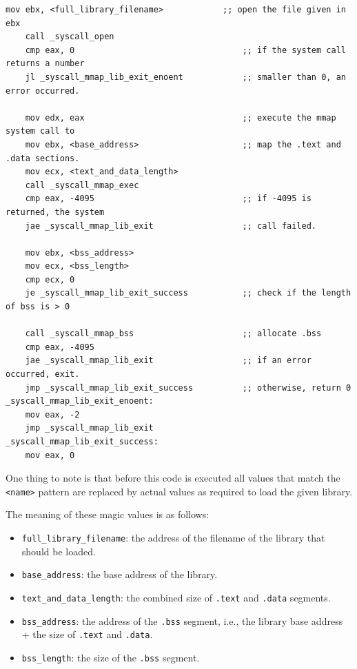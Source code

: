 \documentclass[draft,final]{vutinfth} %
\begin{document}
\begin{lstlisting}[language={[x86masm]Assembler}, caption={Assembly used to emulate the behavior of a \texttt{uselib} system call.}, label={lst:uselib_emu}]
    mov ebx, <full_library_filename>            ;; open the file given in ebx
    call _syscall_open
    cmp eax, 0                                  ;; if the system call returns a number
    jl _syscall_mmap_lib_exit_enoent            ;; smaller than 0, an error occurred.

    mov edx, eax                                ;; execute the mmap system call to
    mov ebx, <base_address>                     ;; map the .text and .data sections.
    mov ecx, <text_and_data_length>
    call _syscall_mmap_exec
    cmp eax, -4095                              ;; if -4095 is returned, the system
    jae _syscall_mmap_lib_exit                  ;; call failed.

    mov ebx, <bss_address>
    mov ecx, <bss_length>
    cmp ecx, 0
    je _syscall_mmap_lib_exit_success           ;; check if the length of bss is > 0

    call _syscall_mmap_bss                      ;; allocate .bss
    cmp eax, -4095
    jae _syscall_mmap_lib_exit                  ;; if an error occurred, exit.
    jmp _syscall_mmap_lib_exit_success          ;; otherwise, return 0
_syscall_mmap_lib_exit_enoent:
    mov eax, -2
    jmp _syscall_mmap_lib_exit
_syscall_mmap_lib_exit_success:
    mov eax, 0
\end{lstlisting}

One thing to note is that before this code is executed all values that match the \texttt{<name>} pattern are replaced by actual values as required to load the given library.

The meaning of these magic values is as follows:
\begin{itemize}
    \item \texttt{full\_library\_filename}: the address of the filename of the library that should be loaded.
    \item \texttt{base\_address}: the base address of the library.
    \item \texttt{text\_and\_data\_length}: the combined size of \texttt{.text} and \texttt{.data} segments.
    \item \texttt{bss\_address}: the address of the \texttt{.bss} segment, i.e., the library base address + the size of \texttt{.text} and \texttt{.data}.
    \item \texttt{bss\_length}: the size of the \texttt{.bss} segment.
\end{itemize}
\end{document}
